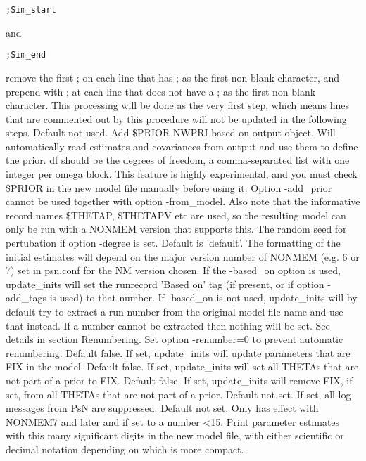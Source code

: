 \begin{optionlist}
\begin{verbatim}
;Sim_start
\end{verbatim}
and
\begin{verbatim}
;Sim_end
\end{verbatim}
remove the first ; on each line that has ; as the first non-blank
character, and prepend with ; at each line that does not
have a ; as the first non-blank character.
This processing will be done as the very first step, which means lines
that are commented out by this procedure will not be updated in the following steps.
\nextopt
{}
Default not used. Add \$PRIOR NWPRI based on output object. Will automatically read
estimates and covariances from output and use them to define the 
prior. df should be the degrees of freedom, a comma-separated list
with one integer per omega block.
This feature is highly experimental, and you must check \$PRIOR 
in the new model file manually before using it.
Option -add\_prior cannot be used together with option -from\_model. 
Also note that the informative record names \$THETAP, \$THETAPV etc are used,
so the resulting model can only be run with a NONMEM version that 
supports this.
\nextopt
{}
The random seed for pertubation if option -degree is set.
\nextopt
{}
Default is 'default'. The formatting of the initial estimates will depend on the
major version number of NONMEM (e.g. 6 or 7) set in psn.conf for the
NM version chosen.
\nextopt
{}
If the -based\_on option is used, update\_inits will set 
the runrecord 'Based on' tag (if present, or if option -add\_tags is used) 
to that number. 
If -based\_on is not used, update\_inits will by default try to extract 
a run number from the original model file name and use that instead.
If a number cannot be extracted then nothing will be set. 
\nextopt
{}
See details in section Renumbering.
Set option -renumber=0 to prevent automatic renumbering.
\nextopt
{}
Default false. If set, update\_inits will update parameters that are FIX in the model.
\nextopt
{}
Default false. If set, update\_inits will set all THETAs that are not part of a prior to FIX.
\nextopt
{}
Default false. If set, update\_inits will remove FIX, if set, from all THETAs that are not part of a prior.
\nextopt
{}
Default not set. If set, all log messages from PsN are suppressed.
\nextopt
{}
Default not set.
Only has effect with NONMEM7 and later and if set to a number <15. 
Print parameter
estimates with this many significant digits in the new model file,
with either scientific or decimal notation depending on which is more compact.
\nextopt
\end{optionlist}

